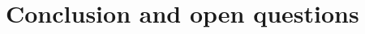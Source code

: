 \documentclass[11pt]{llncs}
\begin{document}
\section{Conclusion and open questions}

\newpage



\ifnum{}


\else


\fi
\end{document}
